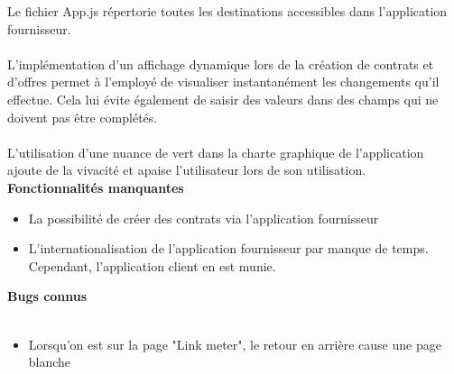 \documentclass[../rapport.tex]{subfiles}
\begin{document}
Le fichier App.js répertorie toutes les destinations accessibles dans l'application fournisseur.\\ \\
L'implémentation d'un affichage dynamique lors de la création de contrats et d'offres permet à l'employé de visualiser instantanément les changements qu'il effectue. Cela lui évite également de saisir des valeurs dans des champs qui ne doivent pas être complétés.\\ \\
L'utilisation d'une nuance de vert dans la charte graphique de l'application ajoute de la vivacité et apaise l'utilisateur lors de son utilisation.
\textbf{Fonctionnalités manquantes} \\
\begin{itemize}
    \item La possibilité de créer des contrats via l'application fournisseur
    \item L'internationalisation de l'application fournisseur par manque de temps. Cependant, l'application client en est munie.
\end{itemize}
\textbf{Bugs connus}\\ \\
\begin{itemize}
    \item Lorsqu'on est sur la page "Link meter", le retour en arrière cause une page blanche
\end{itemize}
\end{document}
